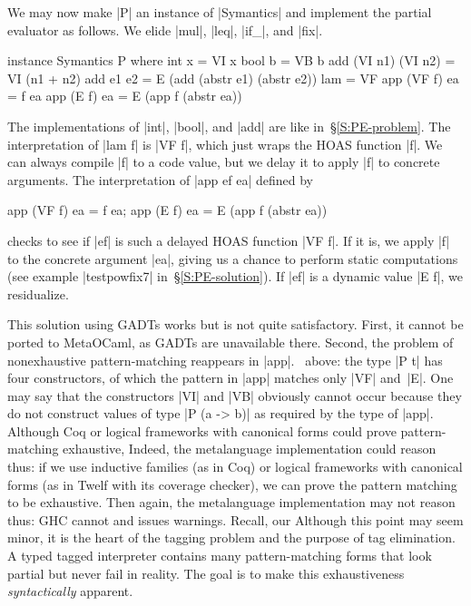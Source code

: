 We may now make |P| an instance of
|Symantics| and implement the partial evaluator as follows. We elide
|mul|, |leq|, |if_|, and |fix|.
\begin{code}
instance Symantics P where
  int x               = VI x
  bool b              = VB b
  add (VI n1) (VI n2) = VI (n1 + n2)
  add e1 e2           = E (add (abstr e1) (abstr e2))
  lam                 = VF
  app (VF f) ea       = f ea
  app (E f)  ea       = E (app f (abstr ea))
\end{code}
\fi
The implementations of |int|, |bool|, and |add| are like
in~\S\ref{S:PE-problem}.
The interpretation of |lam f| is |VF f|, which just wraps the HOAS function |f|. 
We can always compile |f| to a code value,
but we delay it to apply |f| to concrete arguments. The interpretation of
|app ef ea|
\ifshort
defined by
\vspace*{-0.7em}
\begin{code3}
app (VF f) ea = f ea;  app (E f) ea = E (app f (abstr ea))
\end{code3}
\vspace*{-0.7em}
\fi
checks to see if |ef| is such a delayed
HOAS function |VF f|. If it is, we apply |f| to the
concrete argument |ea|, giving us a chance to perform static
computations (see example |testpowfix7| in~\S\ref{S:PE-solution}). If |ef| is a
dynamic value |E f|, we residualize.
\ifshort\else

\fi
This solution using GADTs works but is not quite satisfactory. First, it
cannot be ported to MetaOCaml\ifshort\else, as GADTs are unavailable there\fi.  Second,
the problem of nonexhaustive pattern\hyp matching reappears in
|app|\ifshort. \else\
above: the type |P t| has four constructors, of which the pattern in
|app| matches only |VF| and~|E|. One may say that the
constructors |VI| and |VB| obviously cannot occur because they do not
construct values of type |P (a -> b)| as required by the type of |app|.
\fi
\ifshort
Although Coq or logical
frameworks with canonical forms could prove pattern\hyp matching
exhaustive,
\else
Indeed, the metalanguage implementation could reason thus:
if we use inductive families (as in Coq) or logical
  frameworks with canonical forms (as in Twelf with its coverage checker),
  we can prove the pattern matching to be exhaustive.
Then again, the metalanguage implementation may not reason thus:
\fi
GHC cannot and issues warnings.
\ifshort
Recall, our
\else
Although this point may seem minor, it is the heart of
the tagging problem and the purpose of tag elimination. A typed tagged
interpreter contains many pattern\hyp matching forms that look partial
but never fail in reality. The
\fi
goal is to make this exhaustiveness \emph{syntactically} apparent.


